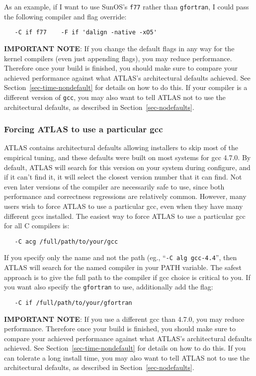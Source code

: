 \documentclass[11pt]{article}
\begin{document}
As an example, if I want to use SunOS's {\tt f77} rather than {\tt gfortran},
I could pass the following compiler and flag override:
\vspace*{-0.1in}
\begin{verbatim}
   -C if f77    -F if 'dalign -native -xO5'
\end{verbatim}

{\bf IMPORTANT NOTE}: If you change the default flags in any way for
the kernel compilers
(even just appending flags), you may reduce performance.  Therefore once
your build is finished, you should make sure to compare your achieved
performance against what ATLAS's architectural defaults achieved.  See
Section~\ref{sec-time-nondefault} for details on how to do this.
If your compiler is a different version of {\tt gcc}, you may also
want to tell ATLAS not to use the architectural defaults, as described
in Section~\ref{sec-nodefaults}.

\subsubsection{Forcing ATLAS to use a particular gcc}
ATLAS contains architectural defaults allowing installers to skip most
of the empirical tuning, and these defaults were built on most systems
for gcc 4.7.0.  By default, ATLAS will search for this version on
your system during configure, and if it can't find it, it will select
the closest version number that it can find.  Not even later versions
of the compiler are necessarily safe to use, since both performance
and correctness regressions are relatively common.  However, many users
wish to force ATLAS to use a particular gcc, even when they have many
different gccs installed.  The easiest way to force ATLAS to use a
particular gcc for all C compilers is:
\begin{verbatim}
   -C acg /full/path/to/your/gcc
\end{verbatim}

If you specify only the name and not the path (eg., ``\texttt{-C alg gcc-4.4}'',
then ATLAS will search for the named compiler in your PATH variable.  The
safest approach is to give the full path to the compiler if gcc choice
is critical to you.  If you want also specify the {\tt gfortran} to use,
additionally add the flag:
\begin{verbatim}
   -C if /full/path/to/your/gfortran
\end{verbatim}

{\bf IMPORTANT NOTE}: If you use a different gcc than 4.7.0,
you may reduce performance.  Therefore once
your build is finished, you should make sure to compare your achieved
performance against what ATLAS's architectural defaults achieved.  See
Section~\ref{sec-time-nondefault} for details on how to do this.
If you can tolerate a long install time, you may also
want to tell ATLAS not to use the architectural defaults, as described
in Section~\ref{sec-nodefaults}.
\end{document}
